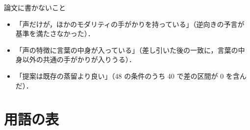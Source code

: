 \documentclass[a4paper,11pt]{ltjsarticle}
\begin{document}
\begin{yoten}{論文に書かないこと}
\begin{itemize}
  \item 「声だけが，ほかのモダリティの手がかりを持っている」（逆向きの予言が基準を満たさなかった）．
  \item 「声の特徴に言葉の中身が入っている」（差し引いた後の一致に，言葉の中身以外の共通の手がかりが入りうる）．
  \item 「提案は既存の蒸留より良い」（48 の条件のうち 40 で差の区間が 0 を含んだ）．
\end{itemize}
\end{yoten}

\appendix
\section{用語の表}
\end{document}
